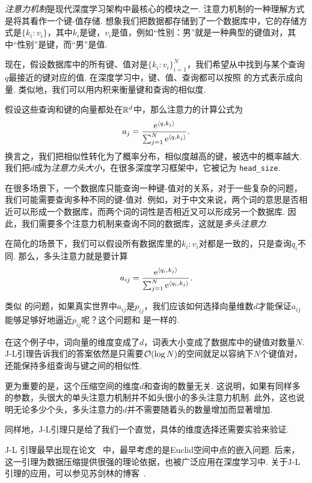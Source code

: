 \begin{example}[多头注意力]
\textit{注意力机制}是现代深度学习架构中最核心的模块之一. 注意力机制的一种理解方式是将其看作一个键-值存储. 想象我们把数据都存储到了一个数据库中，它的存储方式是$\{k_i:v_i\}$，其中$k_i$是键，$v_i$是值，例如“性别：男”就是一种典型的键值对，其中“性别”是键，而“男”是值. 

现在，假设数据库中的所有键、值对是$\{k_i:v_i\}_{i=1}^N$，我们希望从中找到与某个查询$q$最接近的键对应的值. 在深度学习中，键、值、查询都可以按照 的方式表示成向量. 类似地，我们可以用内积来衡量键和查询的相似度. 

假设这些查询和键的向量都处在$\mathbb{R}^d$中，那么注意力的计算公式为
\[
    a_j = \frac{\mathrm{e}^{\left\langle{q},{k_j}\right\rangle}}{\sum_{j=1}^N \mathrm{e}^{\left\langle{q},{k_j}\right\rangle}}.
\]
换言之，我们把相似性转化为了概率分布，相似度越高的键，被选中的概率越大. 我们把$d$成为\textit{注意力头大小}，在很多深度学习框架中，它被记为 \verb#head_size#.

在很多场景下，一个数据库只能查询一种键-值对的关系，对于一些复杂的问题，我们可能需要查询多种不同的键-值对. 例如，对于中文来说，两个词的意思是否相近可以形成一个数据库，而两个词的词性是否相近又可以形成另一个数据库. 因此，我们需要多个注意力机制来查询不同的数据库，这就是\textit{多头注意力}.

在简化的场景下，我们可以假设所有数据库里的$k_i:v_i$对都是一致的，只是查询$q_i$不同. 那么，多头注意力就是要计算
\[
    a_{ij} = \frac{\mathrm{e}^{\left\langle{q_i},{k_j}\right\rangle}}{\sum_{j=1}^N \mathrm{e}^{\left\langle{q_i},{k_j}\right\rangle}}.
\]

类似 的问题，如果真实世界中$a_{ij}$是$p_{ij}$，我们应该如何选择向量维数$d$才能保证$a_{ij}$能够足够好地逼近$p_{ij}$呢？这个问题和 是一样的.

在这个例子中，词向量的维度变成了$d$，词表大小变成了数据库中的键值对数量$N$. J-L引理告诉我们的答案依然是只需要$\mathcal{O}(\log N)$的空间就足以容纳下$N$个键值对，还能保持多组查询与键之间的相似性. 

更为重要的是，这个压缩空间的维度$d$和查询的数量无关. 这说明，如果有同样多的参数，头很大的单头注意力机制并不如头很小的多头注意力机制. 此外，这也说明无论多少个头，多头注意力的$d$并不需要随着头的数量增加而显著增加.

同样地，J-L引理只是给了我们一个直觉，具体的维度选择还需要实验来验证.
\end{example}

\begin{remark}
    J-L 引理最早出现在论文~\cite{johnsonExtensionsLipschitzMappings1984} 中，最早考虑的是Euclid空间中点的嵌入问题. 后来，这一引理为数据压缩提供很强的理论依据，也被广泛应用在深度学习中. 关于J-L引理的应用，可以参见苏剑林的博客~\cite{SuJianLinZuiXiaoShangYuanLiLiuCiXiangLiangDeWeiDuYingGaiZenMeXuanZe,SuJianLinRangRenLiangTanDeJohnsonLindenstraussYinLiYingYongPian,SuJianLinRangRenLiangTanDeJohnsonLindenstraussYinLiLiLunPian}.
\end{remark}

